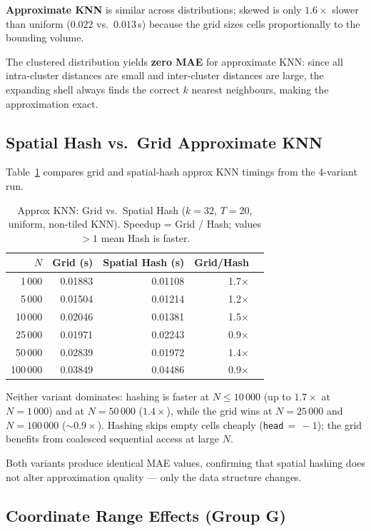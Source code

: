 \documentclass[11pt,a4paper]{article}
\begin{document}
\textbf{Approximate KNN} is similar across distributions; skewed is only
$1.6\times$ slower than uniform ($0.022$ vs.\ $0.013$\,s) because the grid
sizes cells proportionally to the bounding volume.

The clustered distribution yields \textbf{zero MAE} for approximate KNN: since
all intra-cluster distances are small and inter-cluster distances are large, the
expanding shell always finds the correct $k$ nearest neighbours, making the
approximation exact.

\subsection{Spatial Hash vs.\ Grid Approximate KNN}

Table~\ref{tab:spatial_hash} compares grid and spatial-hash approx KNN timings
from the 4-variant run.

\begin{table}[H]
\centering
\caption{Approx KNN: Grid vs.\ Spatial Hash ($k=32$, $T=20$, uniform, non-tiled KNN).
Speedup = Grid / Hash; values ${>}1$ mean Hash is faster.}
\label{tab:spatial_hash}
\begin{tabular}{rrrrr}
\toprule
$N$ & Grid (s) & Spatial Hash (s) & Grid/Hash \\
\midrule
1\,000   & 0.01883 & 0.01108 & 1.7$\times$ \\
5\,000   & 0.01504 & 0.01214 & 1.2$\times$ \\
10\,000  & 0.02046 & 0.01381 & 1.5$\times$ \\
25\,000  & 0.01971 & 0.02243 & 0.9$\times$ \\
50\,000  & 0.02839 & 0.01972 & 1.4$\times$ \\
100\,000 & 0.03849 & 0.04486 & 0.9$\times$ \\
\bottomrule
\end{tabular}
\end{table}

Neither variant dominates: hashing is faster at $N \le 10\,000$ (up to
$1.7\times$ at $N=1\,000$) and at $N=50\,000$ ($1.4\times$), while the grid
wins at $N=25\,000$ and $N=100\,000$ ($\sim 0.9\times$).  Hashing skips empty
cells cheaply (\texttt{head}$\,=\,-1$); the grid benefits from coalesced
sequential access at large $N$.

Both variants produce identical MAE values, confirming that spatial hashing
does not alter approximation quality --- only the data structure changes.

\subsection{Coordinate Range Effects (Group G)}
\end{document}
